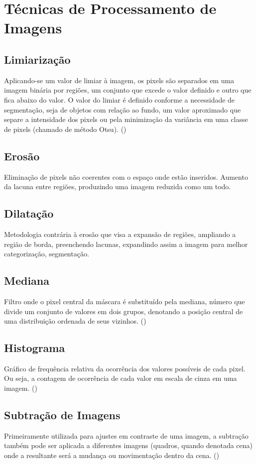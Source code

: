 \documentclass[12pt,oneside,a4paper,chapter=TITLE,section=TITLE,sumario=tradicional]{abntex2}
\begin{document}
\section{Técnicas de Processamento de Imagens}
\subsection{Limiarização}
Aplicando-se um valor de limiar à imagem, os pixels são separados em uma imagem binária por regiões, um conjunto que excede o valor definido e outro que fica abaixo do valor. O valor do limiar é definido conforme a necessidade de segmentação, seja de objetos com relação ao fundo, um valor aproximado que separe a intensidade dos pixels ou pela minimização da variância em uma classe de pixels (chamado de método Otsu). () 

\subsection{Erosão}
Eliminação de pixels não coerentes com o espaço onde estão inseridos. Aumento da lacuna entre regiões, produzindo uma imagem reduzida como um todo.

\subsection{Dilatação}
Metodologia contrária à erosão que visa a expansão de regiões, ampliando a região de borda, preenchendo lacunas, expandindo assim a imagem para melhor categorização, segmentação.

\subsection{Mediana}
Filtro onde o pixel central da máscara é substituído pela mediana, número que divide um conjunto de valores em dois grupos, denotando a posição central de uma distribuição ordenada de seus vizinhos. ()

\subsection{Histograma}
Gráfico de frequência relativa da ocorrência dos valores possíveis de cada pixel. Ou seja, a contagem de ocorrência de cada valor em escala de cinza em uma imagem. ()

\subsection{Subtração de Imagens}
Primeiramente utilizada para ajustes em contraste de uma imagem, a subtração também pode ser aplicada a diferentes imagens (quadros, quando denotada cena) onde a resultante será a mudança ou movimentação dentro da cena. ()
\end{document}
